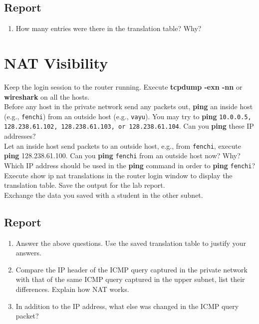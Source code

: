 \documentclass[10pt,a4paper]{article}
\numberwithin{equation}{section}
\numberwithin{figure}{section}
\numberwithin{table}{section}
\begin{document}
    \subsection*{Report}
    \begin{enumerate}
        \item How many entries were there in the translation table? Why?
    \end{enumerate}

\section{NAT Visibility}
    Keep the login session to the router running. Execute \textbf{tcpdump -exn -nn} or \textbf{wireshark} on all the hosts. \\
    Before any host in the private network send any packets out, \textbf{ping} an inside host (e.g., \texttt{fenchi}) from an outside host (e.g., \texttt{vayu}). You may try to \textbf{ping} \texttt{10.0.0.5, 128.238.61.102, 128.238.61.103, or 128.238.61.104}. Can you \textbf{ping} these IP addresses? \\
    Let an inside host send packets to an outside host, e.g., from \texttt{fenchi}, execute \textbf{ping} 128.238.61.100. Can you \textbf{ping} \texttt{fenchi} from an outside host now? Why? Which IP address should be used in the \textbf{ping} command in order to \textbf{ping} \texttt{fenchi}? \\
    Execute show ip nat translations in the router login window to display the translation table. Save the output for the lab report. \\
    Exchange the data you saved with a student in the other subnet.
    \subsection*{Report}
    \begin{enumerate}
        \item Answer the above questions.
        Use the saved translation table to justify your answers.
        \item Compare the IP header of the ICMP query captured in the private network with that of the same ICMP query captured in the upper subnet, list their differences.
        Explain how NAT works.
        \item In addition to the IP address, what else was changed in the ICMP query packet?
    \end{enumerate}
\end{document}

